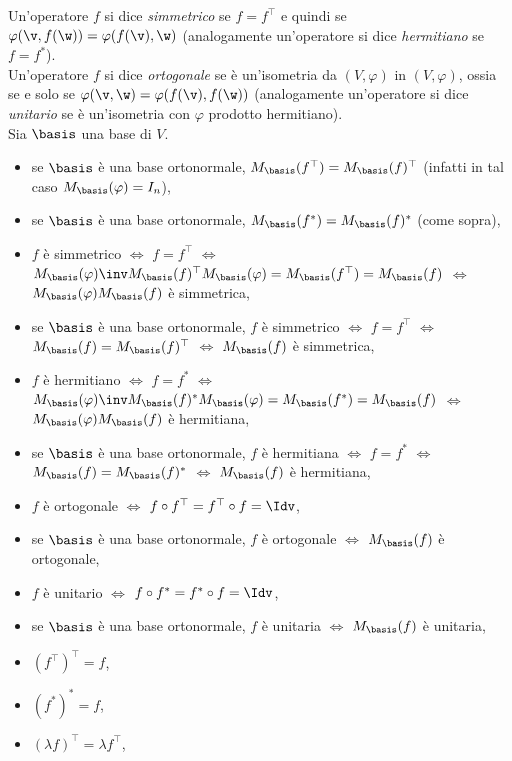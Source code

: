 \documentclass[10pt,landscape]{article}
\begin{document}
\begin{multicols}{3}
		Un'operatore $f$ si dice \textit{simmetrico} se $f = f^\top$ e quindi se $\varphi(\v, f(\w)) = \varphi(f(\v), \w)$ (analogamente un'operatore si dice \textit{hermitiano} se $f = f^*$). \\
		
		Un'operatore $f$ si dice \textit{ortogonale} se è un'isometria da
		$(V, \varphi)$ in $(V, \varphi)$, ossia se e solo se $\varphi(\v, \w) = \varphi(f(\v), f(\w))$ (analogamente un'operatore si dice \textit{unitario} se è un'isometria con
		$\varphi$ prodotto hermitiano). \\
		
		Sia $\basis$ una base di $V$.
		
		\begin{itemize}
			\item se $\basis$ è una base ortonormale, $M_\basis(f^\top) = M_\basis(f)^\top$ (infatti in tal caso $M_\basis(\varphi) = I_n$),
			\item se $\basis$ è una base ortonormale, $M_\basis(f^*) = M_\basis(f)^*$ (come sopra),
			\item $f$ è simmetrico $\iff$ $f = f^\top$ $\iff$ $M_\basis(\varphi)\inv M_\basis(f)^\top M_\basis(\varphi) = M_\basis(f^\top) = M_\basis(f)$ $\iff$ $M_\basis(\varphi) M_\basis(f)$ è simmetrica,
			\item se $\basis$ è una base ortonormale, $f$ è simmetrico $\iff$ $f = f^\top$ $\iff$ $M_\basis(f) = M_\basis(f)^\top$ $\iff$ $M_\basis(f)$ è simmetrica,
			\item $f$ è hermitiano $\iff$ $f = f^*$ $\iff$ $M_\basis(\varphi)\inv M_\basis(f)^* M_\basis(\varphi) = M_\basis(f^*) = M_\basis(f)$ $\iff$ $M_\basis(\varphi) M_\basis(f)$ è hermitiana,
			\item se $\basis$ è una base ortonormale, $f$ è hermitiana $\iff$ $f = f^*$ $\iff$ $M_\basis(f) = M_\basis(f)^*$ $\iff$ $M_\basis(f)$ è hermitiana,
			\item $f$ è ortogonale $\iff$ $f \circ f^\top = f^\top \circ f = \Idv$,
			\item se $\basis$ è una base ortonormale, $f$ è ortogonale $\iff$ $M_\basis(f)$ è ortogonale,
			\item $f$ è unitario $\iff$ $f \circ f^* = f^* \circ f = \Idv$,
			\item se $\basis$ è una base ortonormale, $f$ è unitaria $\iff$ $M_\basis(f)$ è unitaria,
			\item $(f^\top)^\top = f$,
			\item $(f^*)^* = f$,
			\item $(\lambda f)^\top = \lambda f^\top$,

\end{itemize}
\end{multicols}
\end{document}
